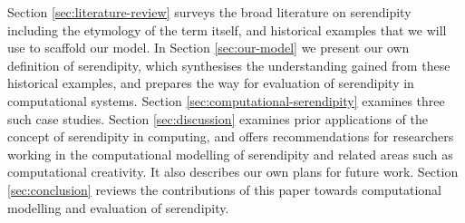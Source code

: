 Section \ref{sec:literature-review} surveys the broad literature on
serendipity including the etymology of the term itself, and historical
examples that we will use to scaffold our model.  In Section
\ref{sec:our-model} we present our own definition of serendipity,
which synthesises the understanding gained from these historical
examples, and prepares the way for evaluation of serendipity in
computational systems.  Section \ref{sec:computational-serendipity}
examines three such case studies.  Section \ref{sec:discussion}
examines prior applications of the concept of serendipity in
computing, and offers recommendations for researchers working in the
computational modelling of serendipity and related areas such as
computational creativity.  It also describes our own plans for future
work.  Section \ref{sec:conclusion} reviews the contributions of this
paper towards computational modelling and evaluation of serendipity.


